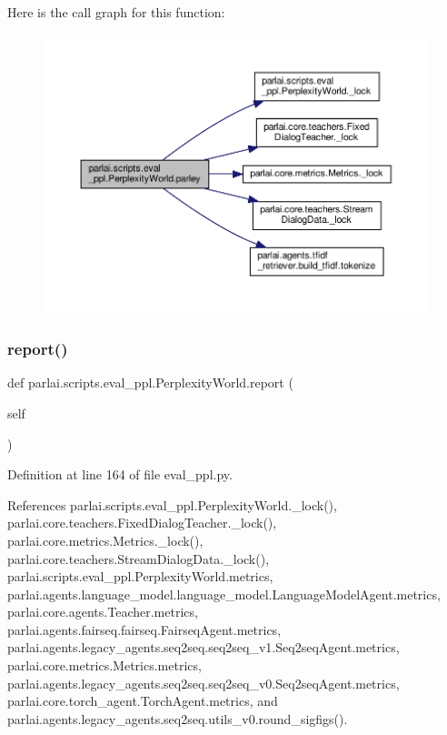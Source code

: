 Here is the call graph for this function\+:
\nopagebreak
\begin{figure}[H]
\begin{center}
\leavevmode
\includegraphics[width=350pt]{classparlai_1_1scripts_1_1eval__ppl_1_1PerplexityWorld_a9040f1a4e0d541a36970ca7c73f5591b_cgraph}
\end{center}
\end{figure}
\mbox{\label{classparlai_1_1scripts_1_1eval__ppl_1_1PerplexityWorld_ae3b38df8869d22000b5bb570de883c1f}} 
\subsubsection{\texorpdfstring{report()}{report()}}
{\footnotesize\ttfamily def parlai.\+scripts.\+eval\+\_\+ppl.\+Perplexity\+World.\+report (\begin{DoxyParamCaption}\item[{}]{self }\end{DoxyParamCaption})}



Definition at line 164 of file eval\+\_\+ppl.\+py.



References parlai.\+scripts.\+eval\+\_\+ppl.\+Perplexity\+World.\+\_\+lock(), parlai.\+core.\+teachers.\+Fixed\+Dialog\+Teacher.\+\_\+lock(), parlai.\+core.\+metrics.\+Metrics.\+\_\+lock(), parlai.\+core.\+teachers.\+Stream\+Dialog\+Data.\+\_\+lock(), parlai.\+scripts.\+eval\+\_\+ppl.\+Perplexity\+World.\+metrics, parlai.\+agents.\+language\+\_\+model.\+language\+\_\+model.\+Language\+Model\+Agent.\+metrics, parlai.\+core.\+agents.\+Teacher.\+metrics, parlai.\+agents.\+fairseq.\+fairseq.\+Fairseq\+Agent.\+metrics, parlai.\+agents.\+legacy\+\_\+agents.\+seq2seq.\+seq2seq\+\_\+v1.\+Seq2seq\+Agent.\+metrics, parlai.\+core.\+metrics.\+Metrics.\+metrics, parlai.\+agents.\+legacy\+\_\+agents.\+seq2seq.\+seq2seq\+\_\+v0.\+Seq2seq\+Agent.\+metrics, parlai.\+core.\+torch\+\_\+agent.\+Torch\+Agent.\+metrics, and parlai.\+agents.\+legacy\+\_\+agents.\+seq2seq.\+utils\+\_\+v0.\+round\+\_\+sigfigs().

